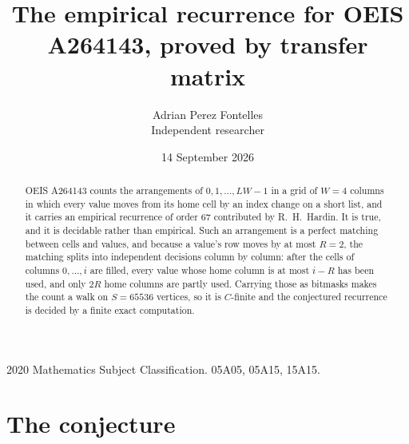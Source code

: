 \documentclass[11pt,a4paper]{article}
\title{The empirical recurrence for OEIS A264143, proved by transfer matrix}
\author{Adrian Perez Fontelles\\ \small Independent researcher}
\date{14 September 2026}
\theoremstyle{plain}
\theoremstyle{definition}
\begin{document}
\maketitle

\begin{abstract}
OEIS A264143 counts the arrangements of $0,1,\dots,LW-1$ in a grid of $W=4$ columns in which
every value moves from its home cell by an index change on a short list, and it carries an
empirical recurrence of order $67$ contributed by R.~H.~Hardin. It is true, and it is
decidable rather than empirical. Such an arrangement is a perfect matching between cells and
values, and because a value's row moves by at most $R=2$, the matching splits into
independent decisions column by column: after the cells of columns $0,\dots,i$ are filled,
every value whose home column is at most $i-R$ has been used, and only $2R$ home columns are
partly used. Carrying those as bitmasks makes the count a walk on $S=65536$ vertices, so it is
$C$-finite and the conjectured recurrence is decided by a finite exact computation.
\end{abstract}

\noindent\small 2020 Mathematics Subject Classification. 05A05, 05A15, 15A15.\normalsize

\section{The conjecture}
\end{document}
